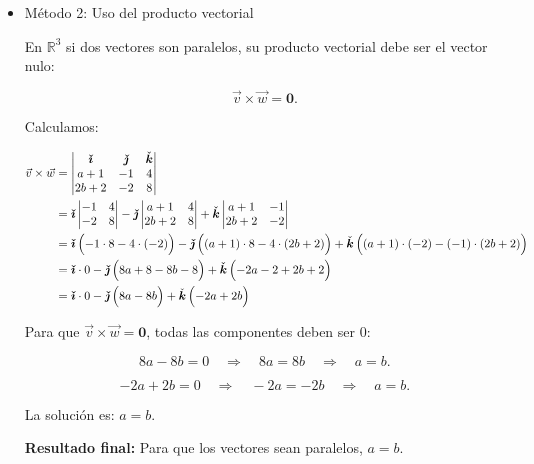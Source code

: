 \documentclass[11pt,a4paper]{article}
\newcommand{\R}{\mathbb{R}}
\newcommand{\iv}{\bm{\check{\imath}}}
\newcommand{\jv}{\bm{\check{\jmath}}}
\newcommand{\kv}{\check{\bm k}}
\begin{document}
\begin{enumerate}[\hspace{-5mm} 1) ]
\begin{itemize}
\item  Método 2: Uso del producto vectorial

En $\R^3$ si dos vectores son paralelos, su producto vectorial debe ser el vector nulo:

\[
\vec{v} \times \vec{w} = \mathbf{0}.
\]

Calculamos:

\begin{align*}
\vec{v} \times \vec{w} &=
\begin{vmatrix}
\iv & \jv & \kv \\
a+1 & -1 & 4 \\
2b+2 & -2 & 8
\end{vmatrix}
\\
 &=
\iv \begin{vmatrix} -1 & 4 \\ -2 & 8 \end{vmatrix}
- \jv \begin{vmatrix} a+1 & 4 \\ 2b+2 & 8 \end{vmatrix}
+ \kv \begin{vmatrix} a+1 & -1 \\ 2b+2 & -2 \end{vmatrix}
\\
& =
\iv \left(-1\cdot 8 - 4\cdot (-2) \rule{0mm}{4mm} \right) 
- \jv \left((a+1)\cdot 8 - 4\cdot (2b+2)  \rule{0mm}{4mm}\right) 
+ \kv \left( (a+1)\cdot(-2) - (-1)\cdot(2b+2) \rule{0mm}{4mm} \right)
\\
& =
\iv \cdot 0  
- \jv \left(8a + 8 - 8b - 8  \rule{0mm}{4mm}\right) 
+ \kv \left(  -2a - 2 + 2b + 2 \rule{0mm}{4mm} \right)
\\
& =
\iv \cdot 0  
- \jv \left( 8a - 8b  \rule{0mm}{4mm}\right) 
+ \kv \left( -2a + 2b \rule{0mm}{4mm} \right)
\end{align*}

Para que $\vec{v} \times \vec{w} = \mathbf{0}$, todas las componentes deben ser 0:

\[
8a - 8b = 0 \quad \Rightarrow \quad 8a = 8b \quad \Rightarrow \quad a = b.
\]

\[
-2a + 2b = 0 \quad \Rightarrow \quad -2a = -2b \quad \Rightarrow \quad a = b.
\]

La  solución es: \qquad $a = b.$ 


\textbf{Resultado final:} Para que los vectores sean paralelos, $ a = b $.
 
\end{itemize}










\end{enumerate}
\end{document}

